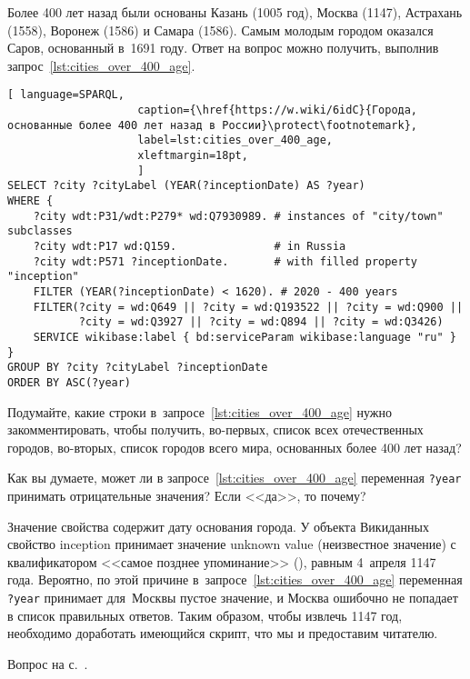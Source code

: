 \begin{task}
    \label{answer:cities_over_400_age}
    Более 400 лет назад были основаны Казань (1005 год), Москва (1147), 
    Астрахань (1558), Воронеж (1586) и Самара (1586). 
    Самым молодым городом оказался Саров, основанный в~1691 году. 
    Ответ на вопрос можно получить, выполнив запрос~\ref{lst:cities_over_400_age}. 

    
    \begin{lstlisting}[ language=SPARQL, 
                    caption={\href{https://w.wiki/6idC}{Города, основанные более 400 лет назад в России}\protect\footnotemark},
                    label=lst:cities_over_400_age,
                    xleftmargin=18pt, 
                    ]
SELECT ?city ?cityLabel (YEAR(?inceptionDate) AS ?year) 
WHERE {
	?city wdt:P31/wdt:P279* wd:Q7930989. # instances of "city/town" subclasses
    ?city wdt:P17 wd:Q159.               # in Russia
	?city wdt:P571 ?inceptionDate.       # with filled property "inception"  
    FILTER (YEAR(?inceptionDate) < 1620). # 2020 - 400 years
    FILTER(?city = wd:Q649 || ?city = wd:Q193522 || ?city = wd:Q900 ||
           ?city = wd:Q3927 || ?city = wd:Q894 || ?city = wd:Q3426)
  	SERVICE wikibase:label { bd:serviceParam wikibase:language "ru" }
}
GROUP BY ?city ?cityLabel ?inceptionDate
ORDER BY ASC(?year)
\end{lstlisting}

Подумайте, какие строки в~запросе~\ref{lst:cities_over_400_age} нужно закомментировать, 
    чтобы получить, во-первых, список всех отечественных городов, 
    во-вторых, 
    список городов всего мира, основанных более 400 лет назад? 

Как вы думаете, может ли в запросе~\ref{lst:cities_over_400_age} 
    переменная \lstinline|?year| принимать отрицательные значения? 
    Если <<да>>, то почему?


    Значение свойства 
    содержит дату основания города.
У объекта Викиданных  
    свойство inception 
    принимает значение unknown value (неизвестное значение) 
    с квалификатором <<самое позднее упоминание>> 
    (), равным 4~апреля 1147 года. 
    Вероятно, по этой причине в~запросе~\ref{lst:cities_over_400_age} 
    переменная \lstinline|?year| принимает для~Москвы пустое значение, 
    и Москва ошибочно не попадает в список правильных ответов. 
    Таким образом, чтобы извлечь 1147 год, 
    необходимо доработать имеющийся скрипт, что мы и предоставим читателю. 


    \small{\AnswerBackref Вопрос на с.~\pageref{fig:city_relation_Russia_S_N}.}
\end{task}


